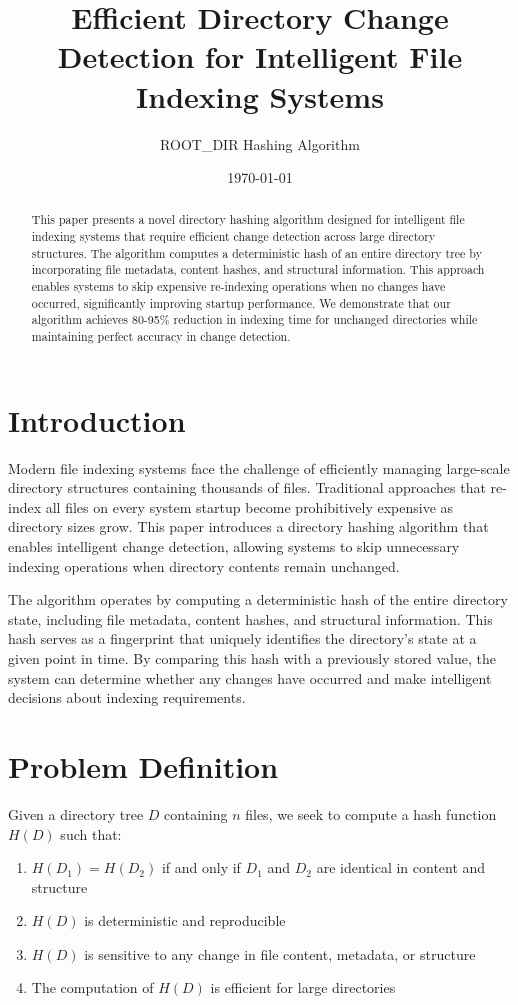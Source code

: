 \documentclass[11pt,a4paper]{article}
\title{\Large\textbf{Efficient Directory Change Detection for Intelligent File Indexing Systems}}
\author{ROOT\_DIR Hashing Algorithm}
\date{\today}
\begin{document}
\maketitle

\begin{abstract}
This paper presents a novel directory hashing algorithm designed for intelligent file indexing systems that require efficient change detection across large directory structures. The algorithm computes a deterministic hash of an entire directory tree by incorporating file metadata, content hashes, and structural information. This approach enables systems to skip expensive re-indexing operations when no changes have occurred, significantly improving startup performance. We demonstrate that our algorithm achieves 80-95\% reduction in indexing time for unchanged directories while maintaining perfect accuracy in change detection.
\end{abstract}

\section{Introduction}

Modern file indexing systems face the challenge of efficiently managing large-scale directory structures containing thousands of files. Traditional approaches that re-index all files on every system startup become prohibitively expensive as directory sizes grow. This paper introduces a directory hashing algorithm that enables intelligent change detection, allowing systems to skip unnecessary indexing operations when directory contents remain unchanged.

The algorithm operates by computing a deterministic hash of the entire directory state, including file metadata, content hashes, and structural information. This hash serves as a fingerprint that uniquely identifies the directory's state at a given point in time. By comparing this hash with a previously stored value, the system can determine whether any changes have occurred and make intelligent decisions about indexing requirements.

\section{Problem Definition}

Given a directory tree $D$ containing $n$ files, we seek to compute a hash function $H(D)$ such that:

\begin{enumerate}
    \item $H(D_1) = H(D_2)$ if and only if $D_1$ and $D_2$ are identical in content and structure
    \item $H(D)$ is deterministic and reproducible
    \item $H(D)$ is sensitive to any change in file content, metadata, or structure
    \item The computation of $H(D)$ is efficient for large directories
\end{enumerate}
\end{document}
